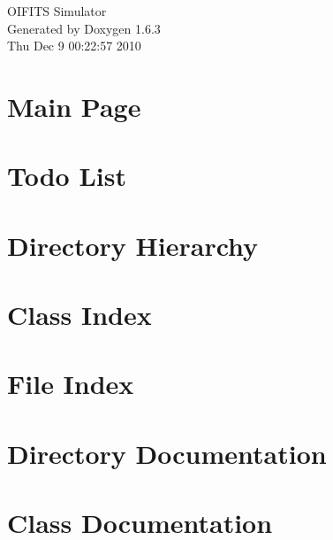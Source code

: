 \documentclass[a4paper]{book}
\begin{document}
\hypersetup{pageanchor=false}
\begin{titlepage}
\vspace*{7cm}
\begin{center}
{\Large OIFITS Simulator }\\
\vspace*{1cm}
{\large Generated by Doxygen 1.6.3}\\
\vspace*{0.5cm}
{\small Thu Dec 9 00:22:57 2010}\\
\end{center}
\end{titlepage}
\clearemptydoublepage
{}
\tableofcontents
\clearemptydoublepage
{}
\hypersetup{pageanchor=true}
\chapter{Main Page}
\label{index}\hypertarget{index}{}
\chapter{Todo List}
\label{todo}
\hypertarget{todo}{}

\chapter{Directory Hierarchy}

\chapter{Class Index}

\chapter{File Index}

\chapter{Directory Documentation}



\chapter{Class Documentation}































\end{document}

